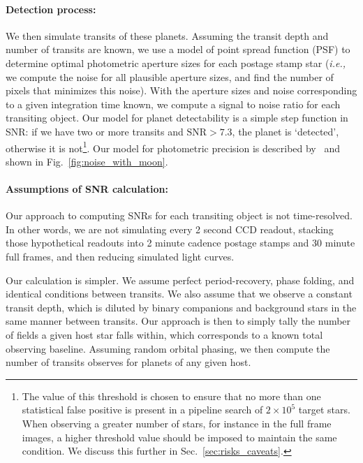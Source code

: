 \paragraph{Detection process:}
We then simulate transits of these planets.  Assuming the transit
depth and number of transits are known, we use a model of \tesss point
spread function (PSF) to determine optimal photometric aperture sizes
for each postage stamp star (\textit{i.e.,} we compute the noise for
all plausible aperture sizes, and find the number of pixels that
minimizes this noise).  With the aperture sizes and noise
corresponding to a given integration time known, we compute a signal
to noise ratio for each transiting object.  Our model for planet
detectability is a simple step function in SNR: if we have two or more
transits and $\text{SNR} > 7.3$, the planet is `detected', otherwise
it is not\footnote{The value of this threshold is chosen to
  ensure that no more than one statistical false positive is present in
  a pipeline search of $2\times10^5$ target stars. When observing a
  greater number of stars, for instance in the full frame images, 
  a higher threshold value should be imposed to maintain the same condition. We
  discuss this further in Sec.~\protect\ref{sec:risks_caveats}.}.  Our model for
\tesss photometric precision is described
by~ and shown in
Fig.~\ref{fig:noise_with_moon}.

\paragraph{Assumptions of SNR calculation:}
Our approach to computing SNRs for each transiting object is not
time-resolved.  In other words, we are not simulating every 2 second
CCD readout, stacking those hypothetical readouts into 2 minute
cadence postage stamps and 30 minute full frames, and then reducing
simulated light curves.

Our calculation is simpler.  We assume perfect period-recovery, phase
folding, and identical conditions between transits.  We also assume
that we observe a constant transit depth, which is diluted by binary
companions and background stars in the same manner between transits.
Our approach is then to simply tally the number of \tess fields a
given host star falls within, which corresponds to a known total
observing baseline.  Assuming random orbital phasing, we then compute
the number of transits \tess observes for planets of any given host.

